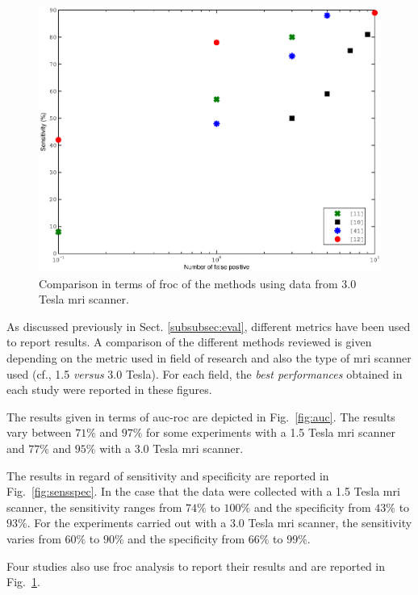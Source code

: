 \begin{figure}
\includegraphics[width=1\linewidth]{09_discussion/figures/froc.eps}
\caption{Comparison in terms of \ac{froc} of the methods using data from 3.0 Tesla \ac{mri} scanner.}
\label{fig:froc}
\end{figure}

As discussed previously in Sect. \ref{subsubsec:eval}, different metrics have been used to report results. A comparison of the different methods reviewed is given depending on the metric used in field of research and also the type of \ac{mri} scanner used (cf., 1.5 \textit{versus} 3.0 Tesla). For each field, the \textit{best performances} obtained in each study were reported in these figures.

The results given in terms of \ac{auc}-\ac{roc} are depicted in Fig.~\ref{fig:auc}. The results vary between $71\%$ and $97\%$ for some experiments with a 1.5 Tesla \ac{mri} scanner and $77\%$ and $95\%$ with a 3.0 Tesla \ac{mri} scanner. 

The results in regard of sensitivity and specificity are reported in Fig.~\ref{fig:sensspec}. In the case that the data were collected with a 1.5 Tesla \ac{mri} scanner, the sensitivity ranges from $74\%$ to $100\%$ and the specificity from $43\%$ to $93\%$. For the experiments carried out with a 3.0 Tesla \ac{mri} scanner, the sensitivity varies from $60\%$ to $90\%$ and the specificity from $66\%$ to $99\%$.

Four studies also use \ac{froc} analysis to report their results and are reported in Fig.~\ref{fig:froc}.



